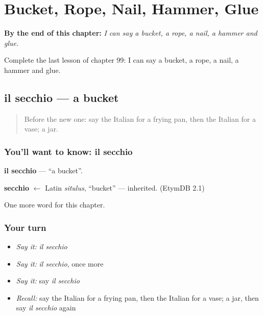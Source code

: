 
\chapter{Bucket, Rope, Nail, Hammer, Glue}
\label{ch:it-bucket-rope-nail-hammer-glue}

\begin{chapteropening}
\textbf{By the end of this chapter:} \emph{I can say a bucket, a rope, a nail, a hammer and glue.}

Complete the last lesson of chapter 99: I can say a bucket, a rope, a nail, a hammer and glue.
\end{chapteropening}

\section[il secchio]{il secchio — a bucket}

\label{lesson:IT-C99-secchio}



\begin{quote}
Before the new one: say the Italian for a frying pan, then the Italian for a vase; a jar.
\end{quote}

\subsection*{You'll want to know: il secchio}
\textbf{il secchio} — \textquotedblleft{}a bucket\textquotedblright{}.

\begin{cousinweb}
\textbf{secchio} $\leftarrow$ Latin \emph{situlus}, \textquotedblleft{}bucket\textquotedblright{} — inherited. (EtymDB 2.1)
\end{cousinweb}

\begin{grammarlens}[title={What you've built}]
One more word for this chapter.
\end{grammarlens}

\subsection*{Your turn}
\begin{itemize}
\raggedright
  \item \emph{Say it:} \emph{il secchio}
  \item \emph{Say it:} \emph{il secchio}, once more
  \item \emph{Say it:} say \emph{il secchio}
  \item \emph{Recall:} say the Italian for a frying pan, then the Italian for a vase; a jar, then say \emph{il secchio} again
\end{itemize}

